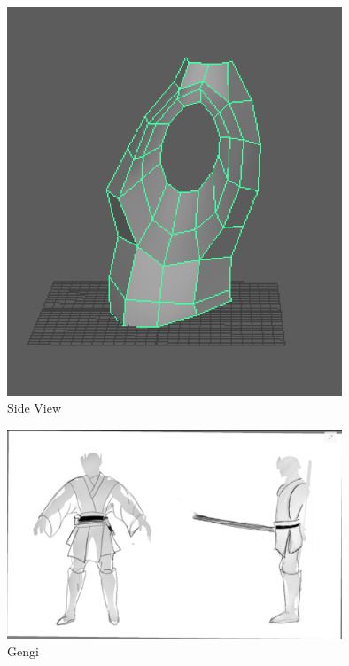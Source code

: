 \documentclass[a4paper]{article}
\begin{document}
\begin{figure}[h]
\centering
\includegraphics[width=10cm]{img/side.png}
\caption{Side View}
\label{fig:Side View}
\end{figure}


\begin{figure}[h]
\centering
\includegraphics[width=10cm]{img/gengiFrontSide.png}
\caption{Gengi}
\label{fig:Gengi}
\end{figure}
\end{document}
